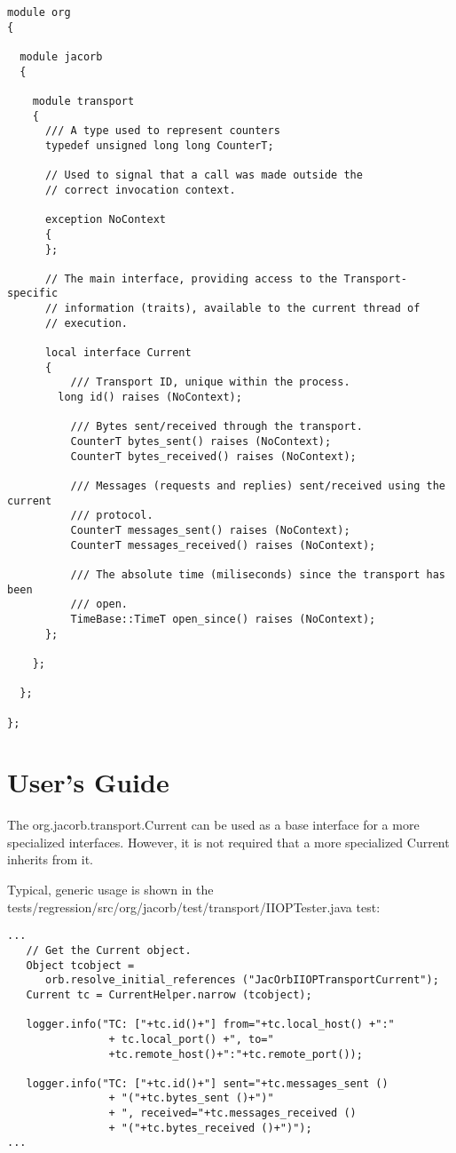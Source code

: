 \begin{verbatim}
module org
{

  module jacorb
  {

    module transport
    {
      /// A type used to represent counters
      typedef unsigned long long CounterT;

      // Used to signal that a call was made outside the
      // correct invocation context.

      exception NoContext
      {
      };

      // The main interface, providing access to the Transport-specific
      // information (traits), available to the current thread of
      // execution.

      local interface Current
      {
          /// Transport ID, unique within the process.
        long id() raises (NoContext);

          /// Bytes sent/received through the transport.
          CounterT bytes_sent() raises (NoContext);
          CounterT bytes_received() raises (NoContext);

          /// Messages (requests and replies) sent/received using the current
          /// protocol.
          CounterT messages_sent() raises (NoContext);
          CounterT messages_received() raises (NoContext);

          /// The absolute time (miliseconds) since the transport has been
          /// open.
          TimeBase::TimeT open_since() raises (NoContext);
      };

    };

  };

};
\end{verbatim}


\section{User's Guide}

The org.jacorb.transport.Current can be used as a base interface for a more
specialized interfaces. However, it is not required that a more specialized
Current inherits from it.

Typical, generic usage is shown in the
tests/regression/src/org/jacorb/test/transport/IIOPTester.java test:

\begin{verbatim}
...
   // Get the Current object.
   Object tcobject =
      orb.resolve_initial_references ("JacOrbIIOPTransportCurrent");
   Current tc = CurrentHelper.narrow (tcobject);

   logger.info("TC: ["+tc.id()+"] from="+tc.local_host() +":"
                + tc.local_port() +", to="
                +tc.remote_host()+":"+tc.remote_port());

   logger.info("TC: ["+tc.id()+"] sent="+tc.messages_sent ()
                + "("+tc.bytes_sent ()+")"
                + ", received="+tc.messages_received ()
                + "("+tc.bytes_received ()+")");
...
\end{verbatim}

